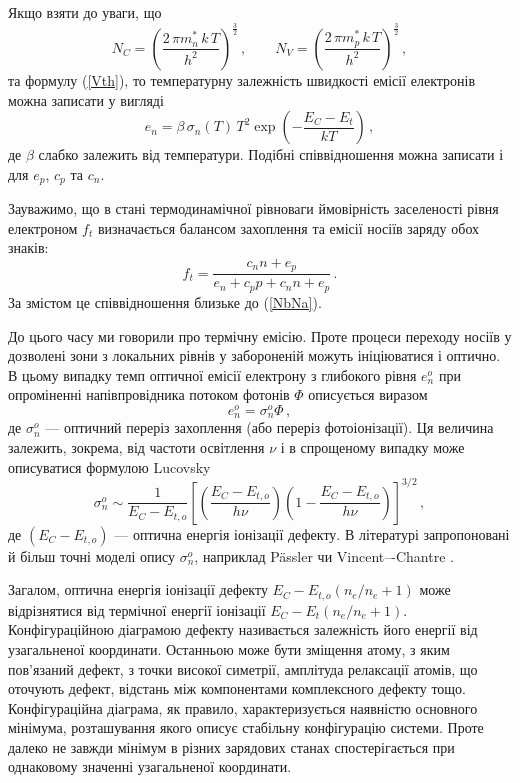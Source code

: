 Якщо взяти до уваги, що
\begin{equation}
\label{Ncv}
N_C=\left(\frac{2\,\pi m_n^*\,k\,T}{h^2}\right)^{\frac{3}{2}}\,,\qquad N_V=\left(\frac{2\,\pi m_p^*\,k\,T}{h^2}\right)^{\frac{3}{2}}\,,
\end{equation}
та формулу (\ref{Vth}),
то температурну залежність швидкості емісії електронів можна записати у вигляді
\begin{equation}
\label{enT}
e_n=\beta\,\sigma_n(T)\,T^2 \exp\left(-\frac{E_C-E_t}{kT}\right)\,,
\end{equation}
де $\beta$ слабко залежить від температури.
Подібні співвідношення можна записати і для $e_p$, $c_p$ та $c_n$.

Зауважимо, що в стані термодинамічної рівноваги ймовірність заселеності рівня електроном $f_t$
визначається балансом захоплення та емісії носіїв заряду обох знаків:
\begin{equation}
\label{ft}
f_t=\frac{c_nn+e_p}{e_n+c_pp+c_nn+e_p}\,.
\end{equation}
За змістом це співвідношення близьке до (\ref{NbNa}).

До цього часу ми говорили про термічну емісію.
Проте процеси переходу носіїв у дозволені зони з локальних рівнів
у забороненій можуть ініціюватися і оптично.
В цьому випадку темп оптичної емісії електрону з глибокого рівня $e_n^o$
при опроміненні напівпровідника потоком фотонів $\Phi$ описується виразом
\begin{equation}
\label{enO}
e_n^o=\sigma_n^o\Phi\,,
\end{equation}
де
$\sigma_n^o$ --- оптичний переріз захоплення (або переріз фотоіонізації).
Ця величина залежить, зокрема, від частоти освітлення $\nu$ і в спрощеному випадку може
описуватися формулою Lucovsky \cite{tuomisto2019}
\begin{equation}
\label{SnO}
\sigma_n^o\sim \frac{1}{E_C-E_{t,o}} \left[\left(\frac{E_C-E_{t,o}}{h\nu}\right)\left(1-\frac{E_C-E_{t,o}}{h\nu}\right)\right]^{3/2}\,,
\end{equation}
де $(E_C-E_{t,o})$ --- оптична енергія іонізації дефекту.
В літературі запропоновані й більш точні моделі опису $\sigma_n^o$,
наприклад P\"{a}ssler \cite{Pasler_op} чи Vincent–-Chantre \cite{Chantre_op}.

Загалом, оптична енергія іонізації дефекту $E_C-E_{t,o}(n_e/n_e+1)$ може
відрізнятися від термічної енергії іонізації $E_C-E_{t}(n_e/n_e+1)$.
Конфігураційною діаграмою дефекту називається залежність його енергії
від узагальненої координати.
Останньою може бути зміщення атому, з яким пов'язаний дефект,
з точки високої симетрії, амплітуда релаксації атомів, що оточують дефект,
відстань між компонентами комплексного дефекту тощо.
Конфігураційна діаграма, як правило, характеризується наявністю основного мінімума,
розташування якого описує стабільну конфігурацію системи.
Проте далеко не завжди мінімум в різних зарядових станах спостерігається при
однаковому значенні узагальненої координати.

